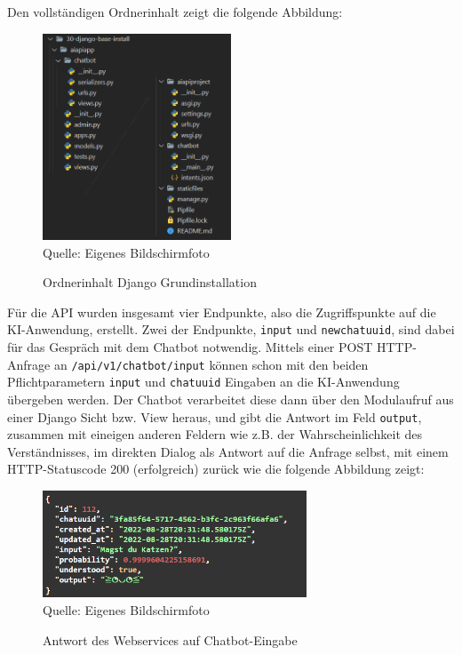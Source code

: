 \documentclass[12pt,oneside,titlepage,listof=totoc,bibliography=totoc]{scrartcl}
\newcommand{\code}[1]{\colorbox{code-gray}{\texttt{#1}}}
\begin{document}
Den vollständigen Ordnerinhalt zeigt die folgende Abbildung: 

\begin{figure}[H]
	\caption{Ordnerinhalt Django Grundinstallation}\label{fig:img-django-base-install}
	\includegraphics[width=0.5\textwidth]{django-folder.png}
	\\
	Quelle: Eigenes Bildschirmfoto
\end{figure}

Für die API wurden insgesamt vier Endpunkte, also die Zugriffspunkte auf die KI-Anwendung, erstellt. Zwei der Endpunkte, \code{input} und \code{newchatuuid}, sind dabei für das Gespräch mit dem Chatbot notwendig. Mittels einer POST HTTP-Anfrage an \code{/api/v1/chatbot/input} können schon mit den beiden Pflichtparametern \code{input} und \code{chatuuid} Eingaben an die KI-Anwendung übergeben werden. Der Chatbot verarbeitet diese dann über den Modulaufruf aus einer Django Sicht bzw. View heraus, und gibt die Antwort im Feld \code{output}, zusammen mit eineigen anderen Feldern wie z.B. der Wahrscheinlichkeit des Verständnisses, im direkten Dialog als Antwort auf die Anfrage selbst, mit einem HTTP-Statuscode 200 (erfolgreich) zurück wie die folgende Abbildung zeigt:

\begin{figure}[H]
	\caption{Antwort des Webservices auf Chatbot-Eingabe}\label{fig:img-cb-200-input}
	\includegraphics[width=0.7\textwidth]{status200-input.png}
	\\
	Quelle: Eigenes Bildschirmfoto
\end{figure}
\end{document}
